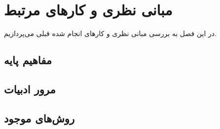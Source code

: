 \chapter{مبانی نظری و کارهای مرتبط}
\label{ch:theory}

در این فصل به بررسی مبانی نظری و کارهای انجام شده قبلی می‌پردازیم.

\section{مفاهیم پایه}
\label{sec:ch2-concepts}


\section{مرور ادبیات}
\label{sec:ch2-literature}


\section{روش‌های موجود}
\label{sec:ch2-methods}


